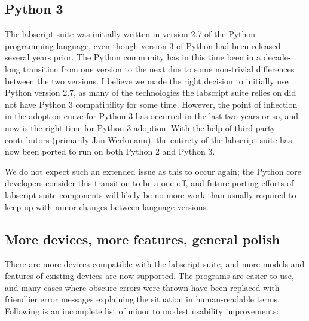 \subsection{Python 3}

The labscript suite was initially written in version 2.7 of the Python programming language, even though version 3 of Python had been released several years prior. The Python community has in this time been in a decade-long transition from one version to the next due to some non-trivial differences between the two versions. I believe we made the right decision to initially use Python version 2.7, as many of the technologies the labscript suite relies on did not have Python 3 compatibility for some time. However, the point of inflection in the adoption curve for Python 3 has occurred in the last two years or so, and now is the right time for Python 3 adoption. With the help of third party contributors (primarily Jan Werkmann), the entirety of the labscript suite has now been ported to run on both Python 2 and Python 3.

We do not expect such an extended issue as this to occur again; the Python core developers consider this transition to be a one-off, and future porting efforts of labscript-suite components will likely be no more work than usually required to keep up with minor changes between language versions.

\subsection{More devices, more features, general polish}

There are more devices compatible with the labscript suite, and more models and features of existing devices are now supported. The programs are easier to use, and many cases where obscure errors were thrown have been replaced with friendlier error messages explaining the situation in human-readable terms. Following is an incomplete list of minor to modest usability improvements:

